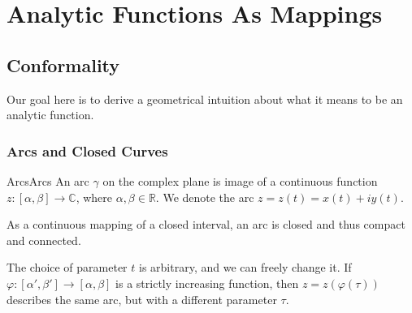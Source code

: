 \documentclass[../main.tex]{subfiles}
\begin{document}
\chapter{Analytic Functions As Mappings}

\section{Conformality}
Our goal here is to derive a geometrical intuition about what it means to be an analytic function.

\subsection{Arcs and Closed Curves}
\begin{definition}{Arcs}{Arcs}
	An arc $\gamma$ on the complex plane is image of a continuous function $z: [\alpha,\beta] \rightarrow \mathbb{C}$, where $\alpha,\beta\in \mathbb{R}$. We denote the arc $z = z(t) = x(t) + iy(t)$.
\end{definition}
As a continuous mapping of a closed interval, an arc is closed and thus compact and connected. 

The choice of parameter $t$ is arbitrary, and we can freely change it. If $\varphi:[\alpha', \beta'] \rightarrow [\alpha,\beta]$ is a strictly increasing function, then $z = z(\varphi(\tau))$ describes the same arc, but with a different parameter $\tau$.
\end{document}
